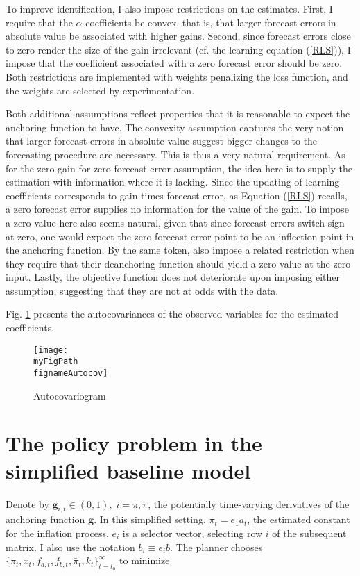 \documentclass[11pt]{article}
\def \myFigPath {../../figures/}
\renewcommand{\[}{\begin{equation}}
\renewcommand{\]}{\end{equation}}
\def\fignameAutocov{autocovariogram_constant_only_pi_only_N_100_nfe_5_loss_0_gridspacing_uniform_Wdiffs2_100000_Wmid_0_Nestimations_command_GMM_LOMgain_univariate_23_Jul_2020}
\begin{document}
To improve identification, I also impose restrictions on the estimates. First, I require that the $\alpha$-coefficients be convex, that is, that larger forecast errors in absolute value be associated with higher gains. Second, since forecast errors close to zero render the size of the gain irrelevant (cf. the learning equation (\ref{RLS})), I impose that the coefficient associated with a zero forecast error should be zero. Both restrictions are implemented with weights penalizing the loss function, and the weights are selected by experimentation. 

Both additional assumptions reflect properties that it is reasonable to expect the anchoring function to have. The convexity assumption captures the very notion that larger forecast errors in absolute value suggest bigger changes to the forecasting procedure are necessary. This is thus a very natural requirement. As for the zero gain for zero forecast error assumption, the idea here is to supply the estimation with information where it is lacking. Since the updating of learning coefficients corresponds to gain times forecast error, as Equation (\ref{RLS}) recalls, a zero forecast error supplies no information for the value of the gain. To impose a zero value here also seems natural, given that since forecast errors switch sign at zero, one would expect the zero forecast error point to be an inflection point in the anchoring function. By the same token, \cite{gobbi2019monetary} also impose a related restriction when they require that their deanchoring function should yield a zero value at the zero input. Lastly, the objective function does not deteriorate upon imposing either assumption, suggesting that they are not at odds with the data.

Fig. \ref{autocovariogram} presents the autocovariances of the observed variables for the estimated coefficients. 


\begin{figure}[h!]
\texttt{[image: \\myFigPath \\fignameAutocov]}
\caption{Autocovariogram}
\label{autocovariogram}
\end{figure}

\section{The policy problem in the simplified baseline model }\label{app_midsimple_problem}
Denote by $\mathbf{g}_{i,t} \in (0,1), \; i=\pi, \bar{\pi}$, the potentially time-varying derivatives of the anchoring function $\mathbf{g}$. In this simplified setting, $\bar{\pi}_t = e_1 a_t$, the estimated constant for the inflation process. $e_i$ is a selector vector, selecting row $i$ of the subsequent matrix. I also use the notation $b_i \equiv e_i b$.   The planner chooses $\{\pi_t, x_t, f_{a,t},  f_{b,t}, \bar{\pi}_t, k_t\}_{t=t_0}^{\infty}$ to minimize
\end{document}
